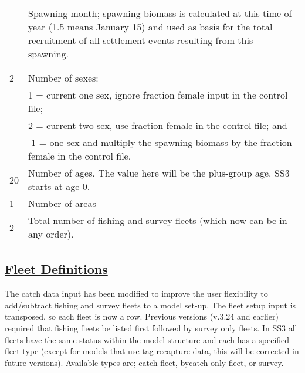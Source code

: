 \begin{center}
\begin{longtable}{p{3cm} p{12cm}}
		\hline
		\raisebox{0.1\ht\strutbox}{\hypertarget{RecrTiminig}{1.5}} & \multirow{1}{1cm}[-0.1cm]{\parbox{12cm}{Spawning month; spawning biomass is calculated at this time of year (1.5 means January 15) and used as basis for the total recruitment of all settlement events resulting from this spawning.}} \Tstrut\\
		& \\
		& \Bstrut\\

		\hline
		2 \Tstrut & Number of sexes: \\
		 & 1 = current one sex, ignore fraction female input in the control file;\\
		 & 2 = current two sex, use fraction female in the control file; and \\
		 & -1 = one sex and multiply the spawning biomass by the fraction female in the control file. \Bstrut\\

		\hline
		20 \Tstrut & Number of ages. The value here will be the plus-group age. SS3 starts at age 0. \\

		\hline
		1 & Number of areas \Tstrut\Bstrut\\

		\hline
		2 \Tstrut & Total number of fishing and survey fleets (which now can be in any order).\\
		\hline
	\end{longtable}
	\vspace*{-1.7\baselineskip}
\end{center}

\hypertarget{FleetDefinitions}{}
\subsection[Fleet Definitions]{\protect\hyperlink{FleetDefinitions}{Fleet Definitions}}
\hypertarget{GenericFleets}{}
The catch data input has been modified to improve the user flexibility to add/subtract fishing and survey fleets to a model set-up. The fleet setup input is transposed, so each fleet is now a row. Previous versions (v.3.24 and earlier) required that fishing fleets be listed first followed by survey only fleets. In SS3 all fleets have the same status within the model structure and each has a specified fleet type (except for models that use tag recapture data, this will be corrected in future versions). Available types are; catch fleet, bycatch only fleet, or survey.   

